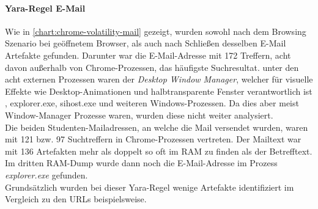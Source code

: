 \paragraph*{Yara-Regel \glqq{}E-Mail\grqq{}}\label{chap:ergebnisse-chrome-uncommon-volatility-email}
Wie in \autoref{chart:chrome-volatility-mail} gezeigt, wurden sowohl nach dem Browsing Szenario bei geöffnetem Browser, als auch nach Schließen desselben E-Mail Artefakte gefunden. Darunter war die E-Mail-Adresse mit 172 Treffern, acht davon außerhalb von Chrome-Prozessen, das häufigste Suchresultat. unter den acht externen Prozessen waren der \textit{Desktop Window Manager}, welcher für visuelle Effekte wie Desktop-Animationen und halbtransparente Fenster verantwortlich ist \cite{dwmWebsite}, explorer.exe, sihost.exe und weiteren Windows-Prozessen. Da dies aber meist Window-Manager Prozesse waren, wurden diese nicht weiter analysiert. \\
Die beiden Studenten-Mailadressen, an welche die Mail versendet wurden, waren mit 121 bzw. 97 Suchtreffern in Chrome-Prozessen vertreten. Der Mailtext war mit 136 Artefakten mehr als doppelt so oft im RAM zu finden als der Betrefftext. Im dritten RAM-Dump wurde dann noch die E-Mail-Adresse im Prozess \textit{explorer.exe} gefunden.\\
Grundsätzlich wurden bei dieser Yara-Regel wenige Artefakte identifiziert im Vergleich zu den URLs beispielsweise.


